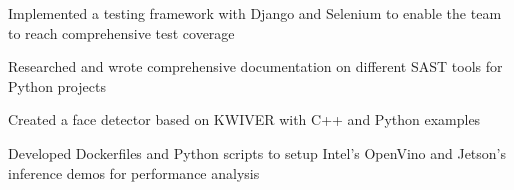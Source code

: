 \documentclass[]{deedy-resume-reversed}
\begin{document}
\begin{minipage}[t]{0.70\textwidth}
\begin{tightemize}
\item Implemented a testing framework with Django and Selenium to enable the team to reach comprehensive test coverage
\item Researched and wrote comprehensive documentation on different SAST tools for Python projects
\end{tightemize}
\sectionsep

\begin{tightemize}
\item Created a face detector based on KWIVER with C++ and Python examples
\item Developed Dockerfiles and Python scripts to setup Intel's OpenVino and Jetson's inference demos for performance analysis
\end{tightemize}
\sectionsep



\end{minipage}
\end{document}
